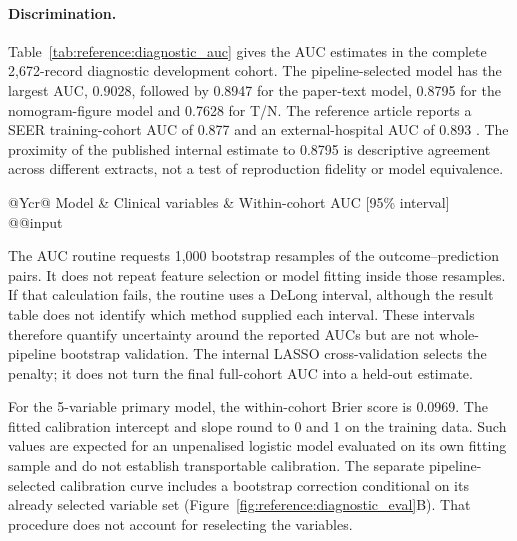 \paragraph{Discrimination.}
Table~\ref{tab:reference:diagnostic_auc} gives the AUC estimates in the complete
2,672-record diagnostic development cohort. The pipeline-selected model has the
largest AUC, 0.9028, followed by 0.8947 for the paper-text model, 0.8795 for the
nomogram-figure model and 0.7628 for T/N. The reference article reports a SEER
training-cohort AUC of 0.877 and an external-hospital AUC of 0.893 \citep{Li2023}. The
proximity of the published internal estimate to 0.8795 is descriptive agreement
across different extracts, not a test of reproduction fidelity or model equivalence.

\begin{table}[htbp]
\centering\small
\caption{Diagnostic discrimination in the complete SEER development cohort
($n=2,672$), following the reference study's diagnostic training-cohort design.
Each model is fitted and evaluated in these same records; brackets show 95\% AUC
intervals and not held-out performance intervals.}
\label{tab:reference:diagnostic_auc}
\begin{tabularx}{\linewidth}{@{}Ycr@{}}
\toprule
Model & Clinical variables & Within-cohort AUC [95\% interval] \\
\midrule
\csname @@input
\bottomrule
\end{tabularx}
\end{table}

The AUC routine requests 1,000 bootstrap resamples of the outcome--prediction
pairs. It does not repeat feature selection or model fitting inside those
resamples. If that calculation fails, the routine uses a DeLong interval, although
the result table does not identify which method supplied each interval. These
intervals therefore quantify uncertainty around the reported AUCs but are not
whole-pipeline bootstrap validation. The internal LASSO cross-validation selects
the penalty; it does not turn the final full-cohort AUC into a held-out estimate.

For the 5-variable primary model, the within-cohort Brier score is 0.0969.
The fitted calibration intercept and slope round to 0 and 1 on the training data.
Such values are expected for an unpenalised logistic model evaluated on its own
fitting sample and do not establish transportable calibration. The separate
pipeline-selected calibration curve includes a bootstrap correction conditional
on its already selected variable set (Figure~\ref{fig:reference:diagnostic_eval}B).
That procedure does not account for reselecting the variables.

